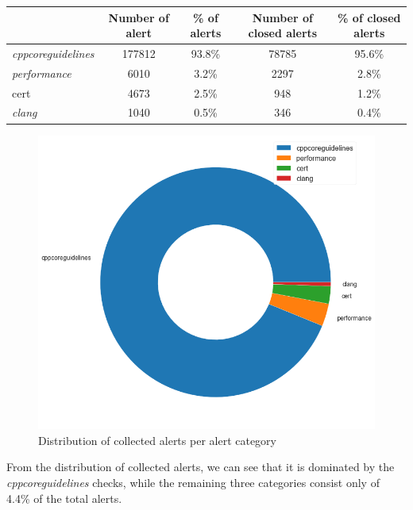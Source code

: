 \begin{table}[H]
	\centering
	\begin{tabular}{@{}lcccc@{}}
		\toprule
		& \textbf{Number of alert} & \textbf{\% of alerts} & \textbf{Number of closed alerts} & \textbf{\% of closed alerts} \\ \midrule
		\textit{cppcoreguidelines} & 177812                   & 93.8\%                & 78785                            & 95.6\%                       \\
		\textit{performance}       & 6010                     & 3.2\%                 & 2297                             & 2.8\%                        \\
		cert                       & 4673                     & 2.5\%                 & 948                              & 1.2\%                        \\
		\textit{clang}             & 1040                     & 0.5\%                 & 346                              & 0.4\%                        \\ \bottomrule
	\end{tabular}
\end{table}
\begin{figure}[H]
	\centering
	\includegraphics[scale=0.4]{./src/data_analysis/pie_alerts.png}
	\caption{Distribution of collected alerts per alert category}
\end{figure}

From the distribution of collected alerts, we can see that it is dominated by the \textit{cppcoreguidelines} checks, while the remaining three categories consist only of 4.4\% of the total alerts.

